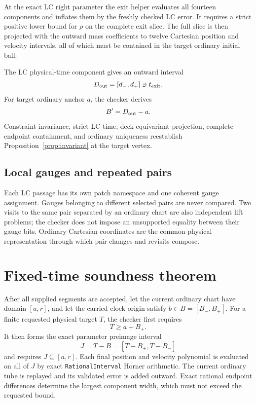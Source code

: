 \documentclass[11pt]{article}
\begin{document}
At the exact LC right parameter the exit helper evaluates all fourteen
components and inflates them by the freshly checked LC error.  It requires a
strict positive lower bound for $\rho$ on the complete exit slice.  The full
slice is then projected with the outward mass coefficients to twelve
Cartesian position and velocity intervals, all of which must be contained in
the target ordinary initial ball.

The LC physical-time component gives an outward interval
\[
 D_{\rm out}=[d_-,d_+]\ni t_{\rm exit}.
\]
For target ordinary anchor $a$, the checker derives
\begin{equation}
 B'=D_{\rm out}-a.
 \label{eq:lc-to-n-clock}
\end{equation}
Constraint invariance, strict LC time, deck-equivariant projection, complete
endpoint containment, and ordinary uniqueness reestablish
Proposition~\ref{prop:invariant} at the target vertex.

\subsection{Local gauges and repeated pairs}

Each LC passage has its own patch namespace and one coherent gauge assignment.
Gauges belonging to different selected pairs are never compared.  Two visits
to the same pair separated by an ordinary chart are also independent lift
problems; the checker does not impose an unsupported equality between their
gauge bits.  Ordinary Cartesian coordinates are the common physical
representation through which pair changes and revisits compose.

\section{Fixed-time soundness theorem}
\label{sec:main-theorem}

After all supplied segments are accepted, let the current ordinary chart have
domain $[a,r]$, and let the carried clock origin satisfy
$b\in B=[B_-,B_+]$.  For a finite requested physical target $T$, the checker
first requires
\begin{equation}
 T\ge a+B_+.
 \label{eq:target-forward}
\end{equation}
It then forms the exact parameter preimage interval
\begin{equation}
 J=T-B=[T-B_+,T-B_-]
 \label{eq:target-preimage}
\end{equation}
and requires $J\subseteq[a,r]$.  Each final position and velocity polynomial
is evaluated on all of $J$ by exact \texttt{RationalInterval} Horner
arithmetic.  The current ordinary tube is replayed and its validated error is
added outward.  Exact rational endpoint differences determine the largest
component width, which must not exceed the requested bound.
\end{document}
